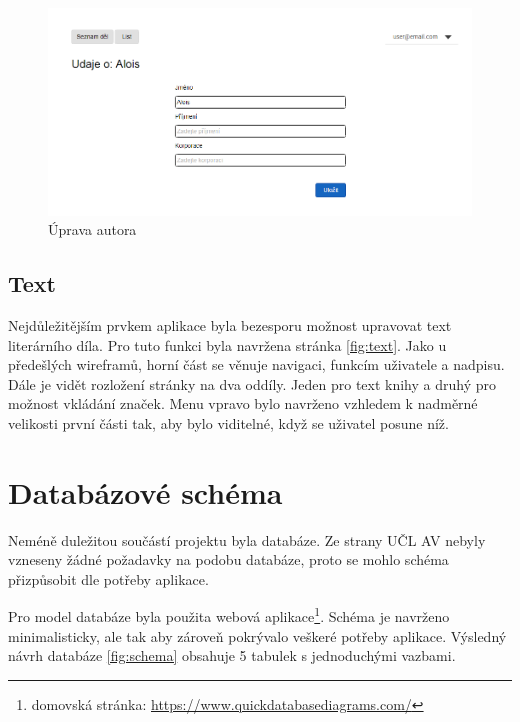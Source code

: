            \begin {figure}[H]\centering
                \includegraphics[width=\textwidth]{images/edit}
                \caption {Úprava autora}
                \label {fig:edit}
            \end{figure}
            
        \subsection{Text}
            Nejdůležitějším prvkem aplikace byla bezesporu možnost upravovat text literárního díla. Pro tuto funkci byla navržena stránka \ref{fig:text}. Jako u předešlých wireframů, horní část se věnuje navigaci, funkcím uživatele a nadpisu. Dále je vidět rozložení stránky na dva oddíly. Jeden pro text knihy a druhý pro možnost vkládání značek. Menu vpravo bylo navrženo vzhledem k nadměrné velikosti první části tak, aby bylo viditelné, když se uživatel posune níž.
            
    \section{Databázové schéma}
        Neméně duležitou součástí projektu byla databáze. Ze strany UČL AV nebyly vzneseny žádné požadavky na podobu databáze, proto se mohlo schéma přizpůsobit dle potřeby aplikace.
        
        Pro model databáze byla použita webová aplikace\footnote{domovská stránka: \url{https://www.quickdatabasediagrams.com/}}. Schéma je navrženo minimalisticky, ale tak aby zároveň pokrývalo veškeré potřeby aplikace. Výsledný návrh databáze \ref{fig:schema} obsahuje 5 tabulek s jednoduchými vazbami.
        
